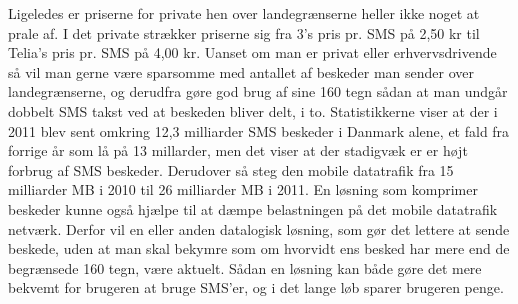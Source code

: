 Ligeledes er priserne for private hen over landegrænserne heller ikke noget at prale af. I det private strækker priserne sig fra 3's pris pr. SMS på 2,50 kr\cite{Pro_4} til Telia's pris pr. SMS på 4,00 kr\cite{Pro_5}. Uanset om man er privat eller erhvervsdrivende så vil man gerne være sparsomme med antallet af beskeder man sender over landegrænserne, og derudfra gøre god brug af sine 160 tegn sådan at man undgår dobbelt SMS takst ved at beskeden bliver delt, i to.
Statistikkerne viser at der i 2011 blev sent omkring 12,3 milliarder SMS beskeder i Danmark alene, et fald fra forrige år som lå på 13 millarder, men det viser at der stadigvæk er er højt forbrug af SMS beskeder. Derudover så steg den mobile datatrafik fra 15 milliarder MB i 2010 til 26 milliarder MB i 2011\cite{Pro_6}. En løsning som komprimer beskeder kunne også hjælpe til at dæmpe belastningen på det mobile datatrafik netværk.
Derfor vil en eller anden datalogisk løsning, som gør det lettere at sende beskede, uden at man skal bekymre som om hvorvidt ens besked har mere end de begrænsede 160 tegn, være aktuelt. Sådan en løsning kan både gøre det mere bekvemt for brugeren at bruge SMS'er, og i det lange løb sparer brugeren penge.